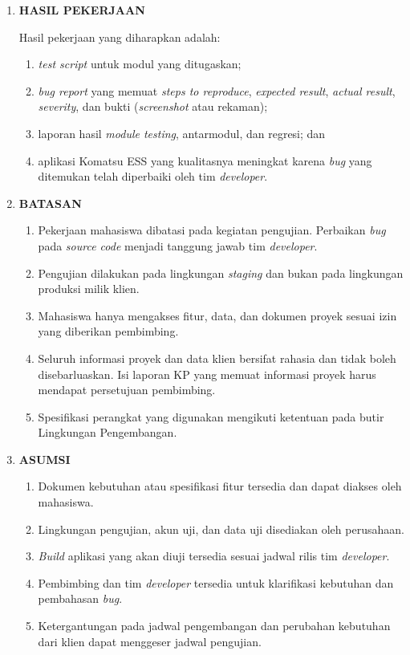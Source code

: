 \begin{framed}
\begin{enumerate}[label=\arabic*.,leftmargin=1.2cm,itemsep=6pt]
\item \textbf{HASIL PEKERJAAN}

Hasil pekerjaan yang diharapkan adalah:
\begin{enumerate}[label=\arabic*)]
\item \textit{test script} untuk modul yang ditugaskan;
\item \textit{bug report} yang memuat \textit{steps to reproduce}, \textit{expected result}, \textit{actual result}, \textit{severity}, dan bukti (\textit{screenshot} atau rekaman);
\item laporan hasil \textit{module testing}, antarmodul, dan regresi; dan
\item aplikasi Komatsu ESS yang kualitasnya meningkat karena \textit{bug} yang ditemukan telah diperbaiki oleh tim \textit{developer}.
\end{enumerate}

\item \textbf{BATASAN}

\begin{enumerate}[label=\arabic*)]
\item Pekerjaan mahasiswa dibatasi pada kegiatan pengujian. Perbaikan \textit{bug} pada \textit{source code} menjadi tanggung jawab tim \textit{developer}.
\item Pengujian dilakukan pada lingkungan \textit{staging} dan bukan pada lingkungan produksi milik klien.
\item Mahasiswa hanya mengakses fitur, data, dan dokumen proyek sesuai izin yang diberikan pembimbing.
\item Seluruh informasi proyek dan data klien bersifat rahasia dan tidak boleh disebarluaskan. Isi laporan KP yang memuat informasi proyek harus mendapat persetujuan pembimbing.
\item Spesifikasi perangkat yang digunakan mengikuti ketentuan pada butir Lingkungan Pengembangan.
\end{enumerate}

\item \textbf{ASUMSI}

\begin{enumerate}[label=\arabic*)]
\item Dokumen kebutuhan atau spesifikasi fitur tersedia dan dapat diakses oleh mahasiswa.
\item Lingkungan pengujian, akun uji, dan data uji disediakan oleh perusahaan.
\item \textit{Build} aplikasi yang akan diuji tersedia sesuai jadwal rilis tim \textit{developer}.
\item Pembimbing dan tim \textit{developer} tersedia untuk klarifikasi kebutuhan dan pembahasan \textit{bug}.
\item Ketergantungan pada jadwal pengembangan dan perubahan kebutuhan dari klien dapat menggeser jadwal pengujian.
\end{enumerate}


\end{enumerate}
\end{framed}

